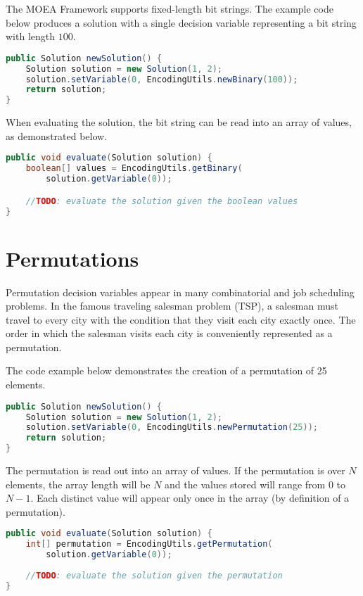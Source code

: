 The MOEA Framework supports fixed-length bit strings.  The example code below produces a solution with a single decision variable representing a bit string with length $100$.
\begin{lstlisting}[language=Java]
public Solution newSolution() {
    Solution solution = new Solution(1, 2);
    solution.setVariable(0, EncodingUtils.newBinary(100));
    return solution;
}
\end{lstlisting}

When evaluating the solution, the bit string can be read into an array of  values, as demonstrated below.
\begin{lstlisting}[language=Java]
public void evaluate(Solution solution) {
    boolean[] values = EncodingUtils.getBinary(
        solution.getVariable(0));

    //TODO: evaluate the solution given the boolean values
}
\end{lstlisting}

\section{Permutations}
Permutation decision variables appear in many combinatorial and job scheduling problems.  In the famous traveling salesman problem (TSP), a salesman must travel to every city with the condition that they visit each city exactly once.  The order in which the salesman visits each city is conveniently represented as a permutation.

The code example below demonstrates the creation of a permutation of 25 elements.
\begin{lstlisting}[language=Java]
public Solution newSolution() {
    Solution solution = new Solution(1, 2);
    solution.setVariable(0, EncodingUtils.newPermutation(25));
    return solution;
}
\end{lstlisting}

The permutation is read out into an array of  values.  If the permutation is over $N$ elements, the array length will be $N$ and the values stored will range from $0$ to $N-1$.  Each distinct value will appear only once in the array (by definition of a permutation).
\begin{lstlisting}[language=Java]
public void evaluate(Solution solution) {
    int[] permutation = EncodingUtils.getPermutation(
        solution.getVariable(0));
        
    //TODO: evaluate the solution given the permutation
}
\end{lstlisting}

